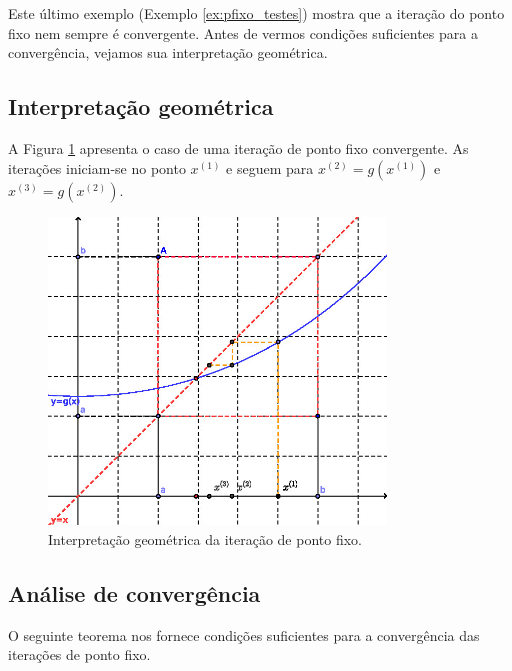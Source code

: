 Este último exemplo (Exemplo \ref{ex:pfixo_testes}) mostra que a iteração do ponto fixo nem sempre é convergente. Antes de vermos condições suficientes para a convergência, vejamos sua interpretação geométrica.

\subsection{Interpretação geométrica}

A Figura \ref{fig:pfixo_interp} apresenta o caso de uma iteração de ponto fixo convergente. As iterações iniciam-se no ponto $x^{(1)}$ e seguem para $x^{(2)} = g(x^{(1)})$ e $x^{(3)} = g(x^{(2)})$.

\begin{figure}[h!]
  \centering
  \includegraphics[width=0.8\textwidth]{./cap_eq1d/dados/fig_pfixo_interp/fig_pfixo_interp}
  \caption{Interpretação geométrica da iteração de ponto fixo.}
  \label{fig:pfixo_interp}
\end{figure}

\subsection{Análise de convergência}

O seguinte teorema nos fornece condições suficientes para a convergência das iterações de ponto fixo.


